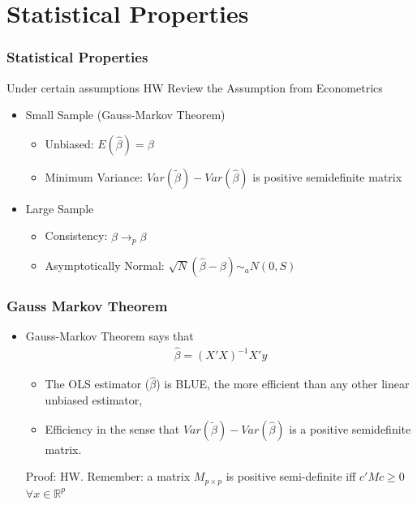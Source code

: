\documentclass[
  shownotes,
  xcolor={svgnames},
  hyperref={colorlinks,citecolor=DarkBlue,linkcolor=DarkRed,urlcolor=DarkBlue}
  , aspectratio=169]{beamer}
\begin{document}
\section{Statistical Properties}
\begin{frame}
\frametitle{Statistical Properties}

Under certain assumptions {\tiny HW Review the Assumption from Econometrics}
\bigskip
\begin{itemize}
  \item Small Sample (Gauss-Markov Theorem)
  \medskip
  \begin{itemize}
    \item Unbiased: $E(\hat \beta) = \beta$
    \medskip
    \item Minimum Variance: $Var(\tilde \beta) - Var(\hat \beta)$ is positive semidefinite matrix
  \end{itemize}
\bigskip  
  \item Large Sample
  \medskip
  \begin{itemize}
    \item Consistency: $\hat \beta \rightarrow_p \beta$
    \medskip
    \item Asymptotically Normal: $\sqrt{N}(\hat \beta -\beta) \sim_a N(0,S)$
  \end{itemize}

\end{itemize}


\end{frame}
\begin{frame}
\frametitle{Gauss Markov Theorem}

\begin{itemize}

\item Gauss-Markov Theorem says that 
\medskip
\begin{align}
 \hat \beta = (X'X)^{-1} X'y
\end{align}

\bigskip

\begin{itemize}
  \item The OLS estimator ($\hat \beta$) is BLUE, the more efficient than any other linear unbiased estimator, 
  \medskip
  \item Efficiency in the sense that  $Var(\tilde \beta) - Var(\hat \beta)$ is a positive semidefinite matrix.
\end{itemize}

\bigskip
\tiny Proof: HW. Remember: a matrix $M_{p\times p}$ is positive semi-definite iff $c'Mc\geq0$ $\forall x\in \mathbb{R}^p$
\end{itemize}
\end{frame}
\end{document}
